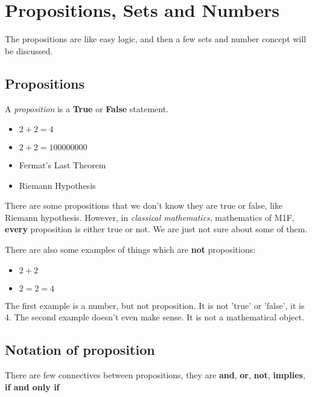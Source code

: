 \documentclass[a4paper]{article}
\begin{document}
\tableofcontents

\setcounter{section}{0}

\section{Propositions, Sets and Numbers}
The propositions are like easy logic, and then a few sets and number concept will be discussed.

\subsection{Propositions}
\begin{defi}[Proposition]
	A \emph{proposition} is a \textbf{True} or \textbf{False} statement.
\end{defi}

\begin{eg}\leavevmode
	\begin{itemize}
		\item $2 + 2 = 4$
		\item $2 + 2 = 100000000$
		\item Fermat's Last Theorem
		\item Riemann Hypothesis
	\end{itemize}
\end{eg}

There are some propositions that we don't know they are true or false, like Riemann hypothesis. However, in \emph{classical mathematics}, mathematics of M1F, \textbf{every} proposition is either true or not. We are just not sure about some of them.

There are also some examples of things which are \textbf{not} propositions:

\begin{eg}\leavevmode
	\begin{itemize}
		\item $2 + 2$
		\item $2 = 2 = 4$
	\end{itemize}
	The first example is a number, but not proposition. It is not 'true' or 'false', it is 4.
	The second example doesn't even make sense. It is not a mathematical object.
\end{eg}

\subsection{Notation of proposition}
There are few connectives between propositions, they are \textbf{and}, \textbf{or}, \textbf{not}, \textbf{implies}, \textbf{if and only if}
\end{document}
